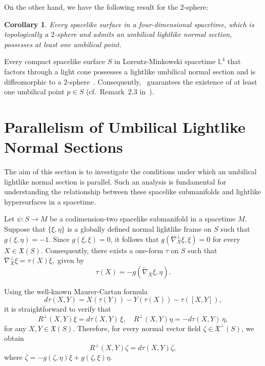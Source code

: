 \documentclass[11pt]{article}
\numberwithin{equation}{section}
\newtheorem{corollary}[theorem]{Corollary}
\begin{document}
		On the other hand, we have the following result for the $2$-sphere:

\begin{corollary}\label{UmbilicalPoint}
	Every spacelike surface in a four-dimensional spacetime, which is topologically a $2$-sphere and admits an umbilical lightlike normal section, possesses at least one umbilical point.
\end{corollary}
	
	Every compact spacelike surface $S$ in Lorentz-Minkowski spacetime $\mathbb{L}^4$ that factors through a light cone possesses a lightlike umbilical normal section and is diffeomorphic to a $2$-sphere~\cite{PalomoRomero13}. Consequently,~ guarantees the existence of at least one umbilical point $p \in S$ (cf.~Remark~2.3 in~\cite{PalomoRomero14}).
	



	\section{Parallelism of Umbilical Lightlike Normal Sections}\label{sec:para}
	The aim of this section is to investigate the conditions under which an umbilical lightlike normal section is parallel. Such an analysis is fundamental for understanding the relationship between these spacelike submanifolds and lightlike hypersurfaces in a spacetime.
	
	Let $\psi\colon S \to M$ be a codimension-two spacelike submanifold in a spacetime $M$. Suppose that $\{\xi, \eta\}$ is a globally defined normal lightlike frame on $S$ such that $g(\xi, \eta) = -1$. Since $g(\xi, \xi) = 0$, it follows that $g(\nabla_X^\perp \xi, \xi) = 0$ for every $X \in \mathfrak{X}(S)$. Consequently, there exists a one-form $\tau$ on $S$ such that $\nabla_X^\perp \xi = \tau(X)\xi,$ given by  
	\begin{equation}\label{eq:tau_definition}
		\tau(X) = -g(\widetilde{\nabla}_X \xi, \eta).
	\end{equation}
	
	Using the well-known Maurer-Cartan formula \[ d\tau(X, Y) = X(\tau(Y)) - Y(\tau(X)) - \tau([X, Y]), \]
	it is straightforward to verify that
	\[
	R^{\perp}(X, Y) \xi = d\tau(X, Y)\, \xi, \quad 
	R^{\perp}(X, Y) \eta = -d\tau(X, Y)\, \eta,
	\]
	for any $X, Y \in \mathfrak{X}(S)$. Therefore, for every normal vector field $\zeta \in \mathfrak{X}^\perp(S)$, we obtain 
	\begin{equation}\label{eq:RNorTau}
		R^\perp(X,Y)\zeta = d\tau(X,Y)\overline{\zeta},
	\end{equation}
	where $\overline{\zeta} = -g(\zeta, \eta)\xi + g(\zeta,\xi)\eta$.
	
\end{document}
